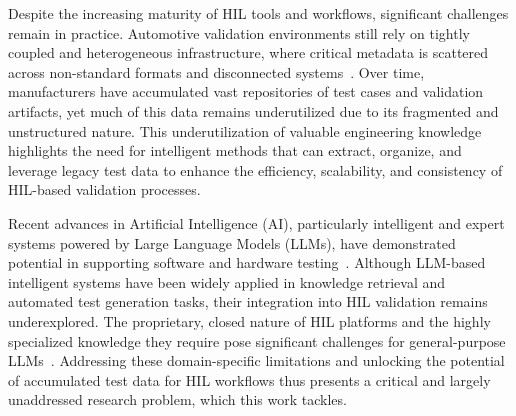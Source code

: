 \documentclass[a4paper,fleqn]{cas-dc}
\begin{document}
Despite the increasing maturity of HIL tools and workflows, significant challenges remain in practice. Automotive validation environments still rely on tightly coupled and heterogeneous infrastructure, where critical metadata is scattered across non-standard formats and disconnected systems~\cite{cheng2024survey}. Over time, manufacturers have accumulated vast repositories of test cases and validation artifacts, yet much of this data remains underutilized due to its fragmented and unstructured nature. This underutilization of valuable engineering knowledge highlights the need for intelligent methods that can extract, organize, and leverage legacy test data to enhance the efficiency, scalability, and consistency of HIL-based validation processes.

Recent advances in Artificial Intelligence (AI), particularly intelligent and expert systems powered by Large Language Models (LLMs), have demonstrated potential in supporting software and hardware testing~\cite{jin2024jailbreakzoo}. Although LLM-based intelligent systems have been widely applied in knowledge retrieval and automated test generation tasks, their integration into HIL validation remains underexplored. The proprietary, closed nature of HIL platforms and the highly specialized knowledge they require pose significant challenges for general-purpose LLMs~\cite{ji2023survey}. Addressing these domain-specific limitations and unlocking the potential of accumulated test data for HIL workflows thus presents a critical and largely unaddressed research problem, which this work tackles.
\end{document}
